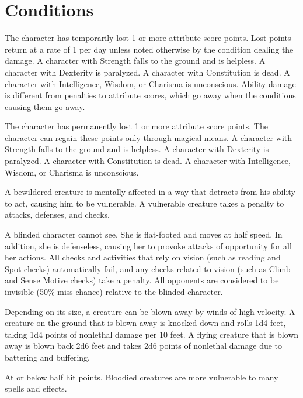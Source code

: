 \appendix
\chapter{Conditions}

 The character has temporarily lost 1 or more attribute score points. Lost points return at a rate of 1 per day unless noted otherwise by the condition dealing the damage. A character with Strength  falls to the ground and is helpless. A character with Dexterity  is paralyzed. A character with Constitution  is dead. A character with Intelligence, Wisdom, or Charisma  is unconscious. Ability damage is different from penalties to attribute scores, which go away when the conditions causing them go away.

 The character has permanently lost 1 or more attribute score points. The character can regain these points only through magical means. A character with Strength  falls to the ground and is helpless. A character with Dexterity  is paralyzed. A character with Constitution  is dead. A character with Intelligence, Wisdom, or Charisma  is unconscious.

 A bewildered creature is mentally affected in a way that detracts from his ability to act, causing him to be vulnerable. A vulnerable creature takes a  penalty to attacks, defenses, and checks.

 A blinded character cannot see. She is flat-footed and moves at half speed. In addition, she is defenseless, causing her to provoke attacks of opportunity for all her actions. All checks and activities that rely on vision (such as reading and Spot checks) automatically fail, and any checks related to vision (such as Climb and Sense Motive checks) take a  penalty. All opponents are considered to be invisible (50\% miss chance) relative to the blinded character.

 Depending on its size, a creature can be blown away by winds of high velocity. A creature on the ground that is blown away is knocked down and rolls 1d4  feet, taking 1d4 points of nonlethal damage per 10 feet. A flying creature that is blown away is blown back 2d6  feet and takes 2d6 points of nonlethal damage due to battering and buffering.

 At or below half hit points. Bloodied creatures are more vulnerable to many spells and effects.

